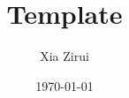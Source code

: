 \documentclass[12pt, a4paper, twoside]{book}
\title{\textbf{Template}}
\author{Xia Zirui}
\date{\today}
\begin{document}
	\renewcommand{\thepage}{\roman{page}}
	\maketitle
	\tableofcontents
	\ifodd\value{page}\newpage\null\fi
	\newpage
	\setcounter{page}{1}
	\renewcommand{\thepage}{\arabic{page}}

	
	
\end{document}
